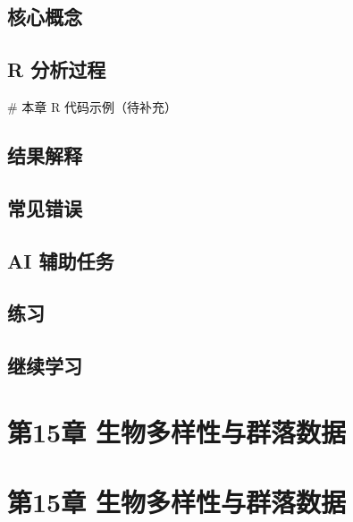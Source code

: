\documentclass[
  letterpaper,
]{scrbook}
\newenvironment{Shaded}{\begin{snugshade}}{\end{snugshade}}
\newcommand{\CommentTok}[1]{\textcolor[rgb]{0.37,0.37,0.37}{#1}}
\begin{document}
\section{核心概念}\label{ux6838ux5fc3ux6982ux5ff5-4}

\section{R 分析过程}\label{r-ux5206ux6790ux8fc7ux7a0b-6}

\begin{Shaded}
\begin{Highlighting}[]
\CommentTok{\# 本章 R 代码示例（待补充）}
\end{Highlighting}
\end{Shaded}

\section{结果解释}\label{ux7ed3ux679cux89e3ux91ca-4}

\section{常见错误}\label{ux5e38ux89c1ux9519ux8bef-11}

\section{AI 辅助任务}\label{ai-ux8f85ux52a9ux4efbux52a1-5}

\section{练习}\label{ux7ec3ux4e60-13}

\section{继续学习}\label{ux7ee7ux7eedux5b66ux4e60-5}

\chapter{第15章
生物多样性与群落数据}\label{ux7b2c15ux7ae0-ux751fux7269ux591aux6837ux6027ux4e0eux7fa4ux843dux6570ux636e}

\chapter{第15章
生物多样性与群落数据}\label{ux7b2c15ux7ae0-ux751fux7269ux591aux6837ux6027ux4e0eux7fa4ux843dux6570ux636e-1}
\end{document}
